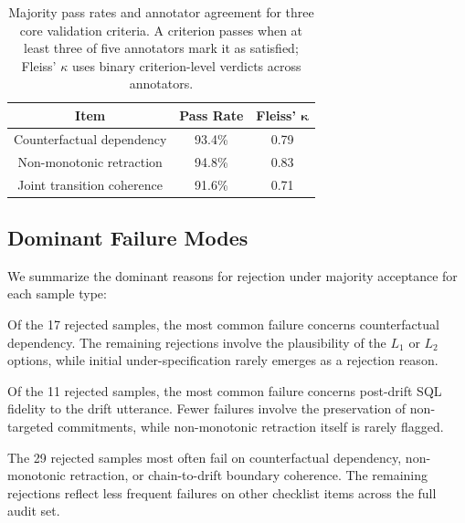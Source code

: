 \begin{table}[!t]
\centering
\small
\setlength{\tabcolsep}{5pt}
\renewcommand{\arraystretch}{1.45}

\begin{tabular*}{\linewidth}{@{\extracolsep{\fill}}ccc@{}}
\toprule
\textbf{Item}
& \textbf{Pass Rate}
& \textbf{Fleiss' $\boldsymbol{\kappa}$} \\
\midrule
Counterfactual dependency
& 93.4\%
& 0.79 \\

Non-monotonic retraction
& 94.8\%
& 0.83 \\

Joint transition coherence
& 91.6\%
& 0.71 \\
\bottomrule
\end{tabular*}
\vspace{-2mm}
\caption{Majority pass rates and annotator agreement for three core validation criteria. A criterion passes when at least three of five annotators mark it as satisfied; Fleiss' $\kappa$ uses binary criterion-level verdicts across annotators.}
\label{tab:item-level-app}
\vspace{-3mm}
\end{table}

\subsection{Dominant Failure Modes}
\label{app:validation-failures}

We summarize the dominant reasons for rejection under majority acceptance for each sample type:

Of the 17 rejected samples, the most common failure concerns counterfactual dependency. The remaining rejections involve the plausibility of the $L_1$ or $L_2$ options, while initial under-specification rarely emerges as a rejection reason.

Of the 11 rejected samples, the most common failure concerns post-drift SQL fidelity to the drift utterance. Fewer failures involve the preservation of non-targeted commitments, while non-monotonic retraction itself is rarely flagged.

The 29 rejected samples most often fail on counterfactual dependency, non-monotonic retraction, or chain-to-drift boundary coherence. The remaining rejections reflect less frequent failures on other checklist items across the full audit set.